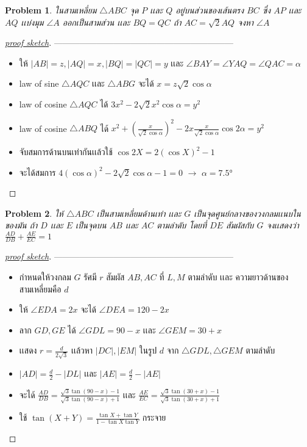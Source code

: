 \documentclass[a4paper,12pt]{article}
\newtheorem{problem}{Problem}[section]
\begin{document}
		\begin{problem}
			ในสามเหลี่ยม $\bigtriangleup{ABC}$ จุด $P$ เเละ $Q$ อยู่บนส่วนของเส้นตรง $BC$ ซึ่ง $AP$ เเละ $AQ$ เเบ่งมุม $\angle{A}$ ออกเป็นสามส่วน เเละ $BQ = QC$ ถ้า $AC = \sqrt{2}AQ$ จงหา $\angle{A}$
		\end{problem}
	   \begin{proof}[\underline{proof sketch}]
	   	---------------------------------------------------------------
	   	\begin{itemize}
	   		\item ให้ $|AB| = z, |AQ| = x, |BQ| = |QC| = y$ เเละ $\angle{BAY} = \angle{YAQ} = \angle{QAC} = \alpha $
	   		\item law of sine $\bigtriangleup{AQC}$ เเละ $\bigtriangleup{ABG}$ จะได้ $x = z\sqrt{2}\cos{\alpha}$
	   		\item law of cosine $\bigtriangleup{AQC}$ ได้ $3x^2 - 2\sqrt{2}x^2\cos{\alpha} = y^2$
	   		\item law of cosine $\bigtriangleup{ABQ}$ ได้ $x^2 + (\frac{x}{\sqrt{2}\cos{\alpha}})^2 - 2x\frac{x}{\sqrt{2}\cos{\alpha}}\cos{2\alpha} = y^2$
	   		\item จับสมการด้านบนเท่ากันเเล้วใช้ $\cos{2X} = 2(\cos{X})^2 - 1$
	   		\item จะได้สมการ $4(\cos{\alpha})^2 - 2\sqrt{2}\cos{\alpha} - 1 = 0$ $\rightarrow$ $\alpha = \ang{7.5} $
	   	\end{itemize}
	   	\end{proof}
   	\newpage
		\begin{problem}
			ให้ $\bigtriangleup{ABC}$ เป็นสามเหลี่ยมด้านเท่า เเละ $G$ เป็นจุดศูนย์กลางของวงกลมเเนบในของมัน ถ้า $D$ เเละ $E$ เป็นจุดบน $AB$ เเละ $AC$ ตามลำดับ โดยที่ $DE$ สัมผัสกับ $G$ จงเเสดงว่า $\frac{AD}{DB}+\frac{AE}{EC} = 1$
		\end{problem}
		\begin{proof}[\underline{proof sketch}]
			---------------------------------------------------------------
			\begin{itemize}
				\item กำหนดให้วงกลม $G$ รัศมี $r$ สัมผัส $AB, AC$ ที่ $L, M$ ตามลำดับ เเละ ความยาวด้านของสามเหลี่ยมคือ $d$
				\item ให้ $\angle{EDA} = 2x$ จะได้ $\angle{DEA} = 120 - 2x $ 
				\item ลาก $GD, GE$  ได้  $\angle{GDL} = 90 - x$ เเละ $\angle{GEM} = 30 + x$
				\item เเสดง $r = \frac{d}{2\sqrt{3}}$ เเล้วหา $|DC|,|EM|$ ในรูป $d$ จาก $\bigtriangleup{GDL},\bigtriangleup{GEM}$ ตามลำดับ
				\item $|AD| = \frac{d}{2} - |DL|$ เเละ $|AE| =  \frac{d}{2} - |AE|$
				\item จะได้ $\frac{AD}{DB} = \frac{\sqrt{3}\tan{(90-x)}-1}{\sqrt{3}\tan{(90-x)}+1} $ เเละ $\frac{AE}{EC} = \frac{\sqrt{3}\tan{(30+x)}-1}{\sqrt{3}\tan{(30+x)}+1}$
				\item ใช้ $\tan{(X+Y)} = \frac{\tan{X} + \tan{Y}}{1 - \tan{X}\tan{Y}}$ กระจาย
			\end{itemize}
		\end{proof}
\end{document}
